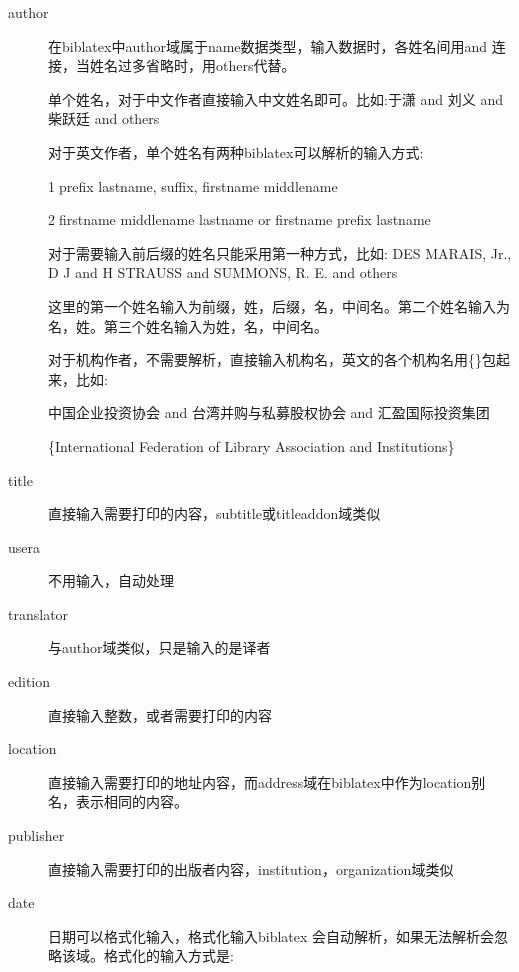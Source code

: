\begin{description}
  \item[author] 在biblatex中author域属于name数据类型，输入数据时，各姓名间用and 连接，当姓名过多省略时，用others代替。

      单个姓名，对于中文作者直接输入中文姓名即可。比如:于潇 and 刘义 and 柴跃廷 and others

      对于英文作者，单个姓名有两种biblatex可以解析的输入方式:

      \textcircled{1}prefix lastname, suffix, firstname middlename

      \textcircled{2}firstname middlename lastname or firstname prefix lastname

      对于需要输入前后缀的姓名只能采用第一种方式，比如:
      DES MARAIS, Jr., D J and H STRAUSS and SUMMONS, R. E. and others

      这里的第一个姓名输入为前缀，姓，后缀，名，中间名。第二个姓名输入为名，姓。第三个姓名输入为姓，名，中间名。


      对于机构作者，不需要解析，直接输入机构名，英文的各个机构名用\{\}包起来，比如:

      中国企业投资协会 and 台湾并购与私募股权协会 and 汇盈国际投资集团

      \{International Federation of Library Association and Institutions\}

  \item[title] 直接输入需要打印的内容，subtitle或titleaddon域类似
  \item[usera] 不用输入，自动处理
  \item[translator] 与author域类似，只是输入的是译者
  \item[edition] 直接输入整数，或者需要打印的内容
  \item[location] 直接输入需要打印的地址内容，而address域在biblatex中作为location别名，表示相同的内容。
  \item[publisher] 直接输入需要打印的出版者内容，institution，organization域类似
  \item[date] 日期可以格式化输入，格式化输入biblatex 会自动解析，如果无法解析会忽略该域。格式化的输入方式是:


\end{description}
